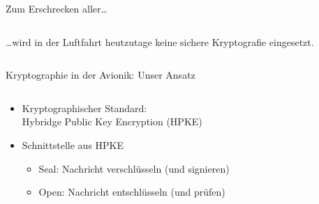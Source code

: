\begin{frame}[c]{Zum Erschrecken aller…}
  \begin{columns}[fullwidth,c]
    \begin{column}{.5\linewidth}

        \footnotesize
        …wird in der Luftfahrt heutzutage keine sichere Kryptografie eingesetzt. 
    \end{column}%
    \hfill
  \end{columns}
\end{frame}


\begin{frame}[c]{Kryptographie in der Avionik: Unser Ansatz}
  \begin{columns}[fullwidth,c]
    \begin{column}{.65\linewidth}
      \begin{itemize}
        \item Kryptographischer Standard:\\
        Hybridge Public Key Encryption (HPKE)
        \item Schnittstelle aus HPKE
        \begin{itemize}
          \item Seal: Nachricht verschlüsseln (und signieren)
          \item Open: Nachricht entschlüsseln (und prüfen)
        \end{itemize}
      \end{itemize}
    \end{column}%
    \hfill
  \end{columns}
\end{frame}


